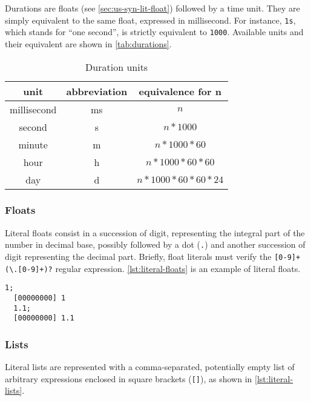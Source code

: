 \documentclass[openright,twoside,12pt]{report}
\begin{document}
Durations are floats (see \autoref{sec:us-syn-lit-float}) followed by a
time unit. They are simply equivalent to the same float, expressed in
millisecond. For instance, \lstinline|1s|, which stands for ``one
second'', is strictly equivalent to \lstinline|1000|. Available units
and their equivalent are shown in \autoref{tab:durations}.

\begin{table}[\floatpos]
  \caption{Duration units}
  \label{tab:durations}
  \centering
  \begin{tabular}{|c|c|c|}
    \hline
    unit        & abbreviation & equivalence for n         \\
    \hline
    millisecond & ms           & $n$                       \\
    second      & s            & $n * 1000$                \\
    minute      & m            & $n * 1000 * 60$           \\
    hour        & h            & $n * 1000 * 60 * 60$      \\
    day         & d            & $n * 1000 * 60 * 60 * 24$ \\
    \hline
  \end{tabular}
\end{table}

\subsubsection{Floats}
\label{sec:us-syn-lit-float}

Literal floats consist in a succession of digit, representing the
integral part of the number in decimal base, possibly followed by a
dot (\lstinline|.|) and another succession of digit representing the
decimal part. Briefly, float literals must verify the
\lstinline|[0-9]+(\.[0-9]+)?| regular expression. \autoref{lst:literal-floats}
is an example of literal floats.

\begin{lstlisting}[caption=Literal floats,label=lst:literal-floats,float=\floatpos]
  1;
  [00000000] 1
  1.1;
  [00000000] 1.1
\end{lstlisting}

\subsubsection{Lists}
\label{sec:us-syn-lit-list}

Literal lists are represented with a comma-separated, potentially
empty list of arbitrary expressions enclosed in square brackets
(\lstinline|[]|), as shown in \autoref{lst:literal-lists}.
\end{document}
